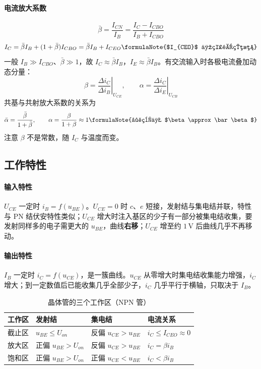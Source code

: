 \paragraph{电流放大系数}
\begin{equation}
\bar\beta = \frac{I_{CN}}{I_B} = \frac{I_C - I_{CBO}}{I_B + I_{CBO}}
\end{equation}
\begin{equation}
I_C = \bar\beta I_B + (1+\bar\beta)I_{CBO} = \bar\beta I_B + I_{CEO}
\formulaNote{$I_{CEO}$ 为穿透电流}
\end{equation}
一般 $I_B\gg I_{CBO}$、$\bar\beta\gg1$，故 $I_C\approx\bar\beta I_B$，$I_E\approx\bar\beta I_B$。有交流输入时各极电流叠加动态分量：
\begin{equation}
\beta = \left.\frac{\Delta i_C}{\Delta i_B}\right|_{U_{CE}},
\qquad
\alpha = \left.\frac{\Delta i_C}{\Delta i_E}\right|_{U_{CB}}
\end{equation}
共基与共射放大系数的关系为
\begin{equation}
\bar\alpha = \frac{\bar\beta}{1+\bar\beta},
\qquad
\alpha = \frac{\beta}{1+\beta}\approx1
\formulaNote{工程上 $\beta\approx\bar\beta$}
\end{equation}
注意 $\beta$ 不是常数，随 $I_C$ 与温度而变。

\subsection{工作特性}

\paragraph{输入特性} $U_{CE}$ 一定时 $i_B=f(u_{BE})$。$U_{CE}=0$ 时 $c$、$e$ 短接，发射结与集电结并联，特性与 PN 结伏安特性类似；$U_{CE}$ 增大时注入基区的少子有一部分被集电结收集，要发射同样多的电子需更大的 $u_{BE}$，曲线\textbf{右移}；$U_{CE}$ 增至约 $1\,\text{V}$ 后曲线几乎不再移动。

\paragraph{输出特性} $I_B$ 一定时 $i_C=f(u_{CE})$，是一簇曲线。$u_{CE}$ 从零增大时集电结收集能力增强，$i_C$ 增大；到一定数值后已能收集几乎全部少子，$i_C$ 几乎平行于横轴，只取决于 $I_B$。

\begin{table}[htbp]
\centering
\caption{晶体管的三个工作区（NPN 管）}
\begin{tabular}{@{}llll@{}}
\hline
工作区 & 发射结 & 集电结 & 电流关系 \\
\hline
截止区 & $u_{BE}\le U_{on}$ & 反偏 $u_{CE}>u_{BE}$ & $i_C\le I_{CEO}\approx0$ \\
放大区 & 正偏 $u_{BE}>U_{on}$ & 反偏 $u_{CE}>u_{BE}$ & $i_C=\beta i_B$ \\
饱和区 & 正偏 $u_{BE}>U_{on}$ & 正偏 $u_{CE}<u_{BE}$ & $i_C<\beta i_B$ \\
\hline
\end{tabular}
\end{table}

